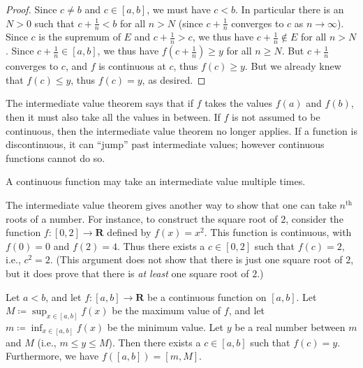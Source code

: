 \begin{proof}
    Since \(c \neq b\) and \(c \in [a, b]\), we must have \(c < b\).
    In particular there is an \(N > 0\) such that \(c + \frac{1}{n} < b\) for all \(n > N\)
    (since \(c + \frac{1}{n}\) converges to \(c\) as \(n \to \infty\)).
    Since \(c\) is the supremum of \(E\) and \(c + \frac{1}{n} > c\), we thus have \(c + \frac{1}{n} \notin E\) for all \(n > N\).
    Since \(c + \frac{1}{n} \in [a, b]\), we thus have \(f(c + \frac{1}{n}) \geq y\) for all \(n \geq N\).
    But \(c + \frac{1}{n}\) converges to \(c\), and \(f\) is continuous at \(c\), thus \(f(c) \geq y\).
    But we already knew that \(f(c) \leq y\), thus \(f(c) = y\), as desired.
\end{proof}

\begin{note}
    The intermediate value theorem says that if \(f\) takes the values \(f(a)\) and \(f(b)\), then it must also take all the values in between.
    If \(f\) is not assumed to be continuous, then the intermediate value theorem no longer applies.
    If a function is discontinuous, it can ``jump'' past intermediate values;
    however continuous functions cannot do so.
\end{note}

\begin{remark}\label{9.7.2}
    A continuous function may take an intermediate value multiple times.
\end{remark}

\begin{remark}\label{9.7.3}
    The intermediate value theorem gives another way to show that one can take \(n^{\text{th}}\) roots of a number.
    For instance, to construct the square root of \(2\), consider the function \(f : [0, 2] \to \mathbf{R}\) defined by \(f(x) = x^2\).
    This function is continuous, with \(f(0) = 0\) and \(f(2) = 4\).
    Thus there exists a \(c \in [0, 2]\) such that \(f(c) = 2\), i.e., \(c^2 = 2\).
    (This argument does not show that there is just one square root of \(2\), but it does prove that there is \emph{at least} one square root of \(2\).)
\end{remark}

\begin{corollary}\label{9.7.4}
    Let \(a < b\), and let \(f : [a, b] \to \mathbf{R}\) be a continuous function on \([a, b]\).
    Let \(M \coloneqq \sup_{x \in [a, b]} f(x)\) be the maximum value of \(f\), and let \(m \coloneqq \inf_{x \in [a, b]} f(x)\) be the minimum value.
    Let \(y\) be a real number between \(m\) and \(M\) (i.e., \(m \leq y \leq M\)).
    Then there exists a \(c \in [a, b]\) such that \(f(c) = y\).
    Furthermore, we have \(f([a, b]) = [m, M]\).
\end{corollary}

